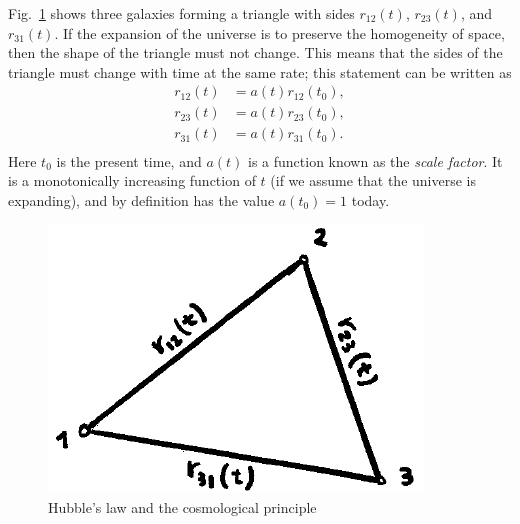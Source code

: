 \documentclass[11pt, a4paper,oneside,openright]{book}
\numberwithin{equation}{section}
\begin{document}
Fig.\ \ref{fig:lec4_8} shows three galaxies forming a triangle with sides $r_{12}(t)$, $r_{23}(t)$, and $r_{31}(t)$. If the expansion of the universe is to preserve the homogeneity of space, then the shape of the triangle must not change. This means that the sides of the triangle must change with time at the same rate; this statement can be written as
\begin{equation}
\begin{split}
r_{12}(t)&=a(t)r_{12}(t_0),\\
r_{23}(t)&=a(t)r_{23}(t_0),\\
r_{31}(t)&=a(t)r_{31}(t_0).\\
\end{split}
\end{equation}
Here $t_0$ is the present time, and $a(t)$ is a function known as the {\it scale factor}. It is a monotonically increasing function of $t$ (if we assume that the universe is expanding), and by definition has the value $a(t_0)=1$ today.
\begin{figure}[ht]
\begin{center}
\includegraphics[scale=0.6]{Draw/lec4_8.png}
\end{center}
\caption{Hubble's law and the cosmological principle}
\label{fig:lec4_8}
\end{figure}
\end{document}
